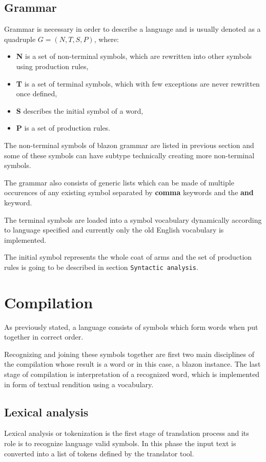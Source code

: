 \documentclass[12pt,a4paper]{article}
\let\oldsection\section
\renewcommand\section{\clearpage\oldsection}
\begin{document}
\newpage
\subsection{Grammar}
Grammar is necessary in order to describe a language and is usually denoted as a quadruple $G = (N, T, S, P)$, where:
\begin{itemize}	\setlength\itemsep{-0.5em}
\item \textbf{N} is a set of non-terminal symbols, which are rewritten into other symbols using production rules,
\item \textbf{T} is a set of terminal symbols, which with few exceptions are never rewritten once defined,
\item \textbf{S} describes the initial symbol of a word,
\item \textbf{P} is a set of production rules.
\end{itemize}

The non-terminal symbols of blazon grammar are listed in previous section and some of these symbols can have subtype technically creating more non-terminal symbols.

The grammar also consists of generic lists which can be made of multiple occurences of any existing symbol separated by \textbf{comma} keywords and the \textbf{and} keyword.

The terminal symbols are loaded into a symbol vocabulary dynamically according to language specified and currently only the old English vocabulary is implemented.

The initial symbol represents the whole coat of arms and the set of production rules is going to be described in section \texttt{Syntactic analysis}.


\section{Compilation}
As previously stated, a language consists of symbols which form words when put together in correct order.

Recognizing and joining these symbols together are first two main disciplines of the compilation whose result is a word or in this case, a blazon instance.
The last stage of compilation is interpretation of a recognized word, which is implemented in form of textual rendition using a vocabulary.


\subsection{Lexical analysis} 
Lexical analysis or tokenization is the first stage of translation process and its role is to recognize language valid symbols.
In this phase the input text is converted into a list of tokens defined by the translator tool.
\end{document}
